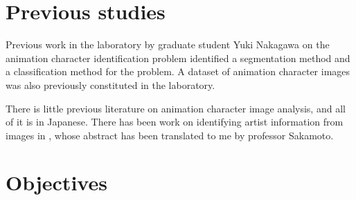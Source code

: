\section{Previous studies}
Previous work in the laboratory by graduate student Yuki Nakagawa on the animation character identification problem identified a segmentation method\cite{felzenszwalb2004efficient} and a classification method\cite{harchaoui2007image} for the problem. A dataset of animation character images was also previously constituted in the laboratory.

There is little previous literature on animation character image analysis, and all of it is in Japanese. There has been work on identifying artist information from images in \cite{itamochi2012identification}, whose abstract has been translated to me by professor Sakamoto.

\section{Objectives}

